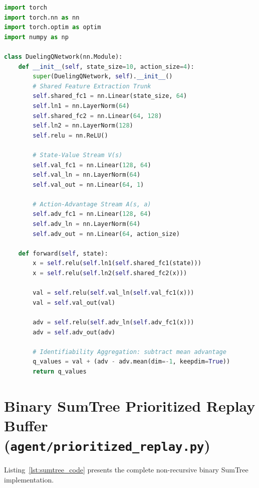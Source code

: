 \documentclass[12pt,a4paper,oneside]{report}
\begin{document}
\begin{lstlisting}[language=Python, caption={PyTorch Dueling Q-Network Architecture with Layer Normalization}, label={lst:dqn_router_code}]
import torch
import torch.nn as nn
import torch.optim as optim
import numpy as np

class DuelingQNetwork(nn.Module):
    def __init__(self, state_size=10, action_size=4):
        super(DuelingQNetwork, self).__init__()
        # Shared Feature Extraction Trunk
        self.shared_fc1 = nn.Linear(state_size, 64)
        self.ln1 = nn.LayerNorm(64)
        self.shared_fc2 = nn.Linear(64, 128)
        self.ln2 = nn.LayerNorm(128)
        self.relu = nn.ReLU()

        # State-Value Stream V(s)
        self.val_fc1 = nn.Linear(128, 64)
        self.val_ln = nn.LayerNorm(64)
        self.val_out = nn.Linear(64, 1)

        # Action-Advantage Stream A(s, a)
        self.adv_fc1 = nn.Linear(128, 64)
        self.adv_ln = nn.LayerNorm(64)
        self.adv_out = nn.Linear(64, action_size)

    def forward(self, state):
        x = self.relu(self.ln1(self.shared_fc1(state)))
        x = self.relu(self.ln2(self.shared_fc2(x)))

        val = self.relu(self.val_ln(self.val_fc1(x)))
        val = self.val_out(val)

        adv = self.relu(self.adv_ln(self.adv_fc1(x)))
        adv = self.adv_out(adv)

        # Identifiability Aggregation: subtract mean advantage
        q_values = val + (adv - adv.mean(dim=-1, keepdim=True))
        return q_values
\end{lstlisting}

\section{Binary SumTree Prioritized Replay Buffer (\texttt{agent/prioritized\_replay.py})}
Listing~\ref{lst:sumtree_code} presents the complete non-recursive binary SumTree implementation.
\end{document}
